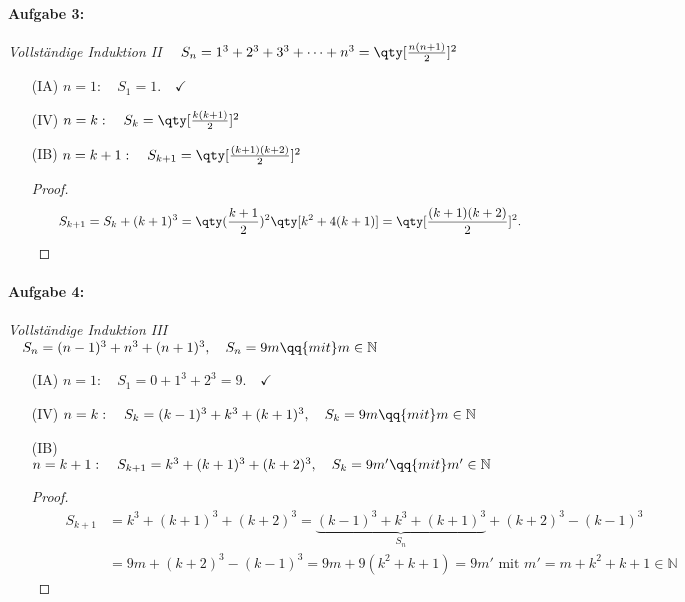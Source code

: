 \paragraph{Aufgabe 3: } \emph{Vollständige Induktion II} $\quad S_n=1^3+2^3+3^3+\dots+n^3 = \qty[\frac{n(n+1)}{2}]^2$

\begin{enumerate}
    \item[(IA)] $n=1: \quad S_1 = 1. \quad\checkmark$ 
    \item[(IV)] $n=k: \quad S_k=\qty[\frac{k(k+1)}{2}]^2$
    \item[(IB)] $n=k+1: \quad S_{k+1}=\qty[\frac{(k+1)(k+2)}{2}]^2$\\
    \begin{proof}$~$\\[-1.7cm]
        \begin{align}
            \qquad S_{k+1} &= S_k+(k+1)^3=\qty(\frac{k+1}{2})^2\qty[k^2+4(k+1)]=\qty[\frac{(k+1)(k+2)}{2}]^2.
        \end{align}
    \end{proof}
\end{enumerate}
%

\paragraph{Aufgabe 4: } \emph{Vollständige Induktion III} $\quad S_n = (n-1)^3 + n^3 + (n+1)^3, \quad S_n = 9m \qq{mit} m \in \mathbb{N}$

\begin{enumerate}
    \item[(IA)] $n=1: \quad S_1 = 0 + 1^3 + 2^3 = 9. \quad\checkmark$ 
    \item[(IV)] $n=k: \quad S_k = (k-1)^3 + k^3 + (k+1)^3, \quad S_k = 9m \qq{mit} m \in \mathbb{N}$
    \item[(IB)] $n=k+1: \quad S_{k+1} = k^3 + (k+1)^3 + (k+2)^3, \quad S_k = 9m' \qq{mit} m' \in \mathbb{N}$\\
    \begin{proof}$~$\\[-1.4cm]
        \begin{align}
            \qquad S_{k+1}&=k^3+(k+1)^3+(k+2)^3=\underbrace{(k-1)^3+k^3+(k+1)^3}_{S_n}+(k+2)^3-(k-1)^3\\
            &=9m+(k+2)^3-(k-1)^3=9m+9(k^2+k+1)=9m' \text{ mit } m'=m+k^2+k+1\in\mathbb{N}
        \end{align}
    \end{proof}
\end{enumerate}
%
